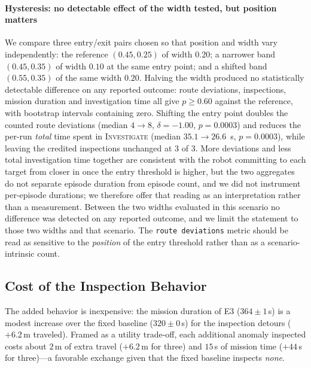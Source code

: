 \paragraph*{Hysteresis: no detectable effect of the width tested, but position
matters}
We compare three entry/exit pairs chosen so that position and width vary
independently: the reference $(0.45,0.25)$ of width $0.20$; a narrower band
$(0.45,0.35)$ of width $0.10$ at the same entry point; and a shifted band
$(0.55,0.35)$ of the same width $0.20$. Halving the width produced no statistically
detectable difference on any reported outcome: route deviations, inspections,
mission duration and investigation time all give $p\ge0.60$ against the reference,
with bootstrap intervals containing zero.
Shifting the entry point doubles
the counted route deviations (median $4\rightarrow8$, $\delta=-1.00$, $p=0.0003$) and
reduces the per-run \emph{total} time spent in \textsc{Investigate} (median
$35.1\rightarrow26.6$~s, $p=0.0003$), while leaving the credited inspections
unchanged at $3$ of $3$. More deviations and less total investigation time together
are consistent with the robot committing to each target from closer in once the entry
threshold is higher, but the two aggregates do not separate episode duration from
episode count, and we did not instrument per-episode durations; we therefore offer
that reading as an interpretation rather than a measurement. Between the two widths evaluated in this scenario no difference was detected on any
reported outcome, and we limit the statement to those two widths and that scenario.
The \texttt{route deviations} metric should be read as sensitive to the \emph{position}
of the entry threshold rather than as a scenario-intrinsic count.

\subsection{Cost of the Inspection Behavior}
The added behavior is inexpensive: the mission duration of E3 ($364\pm1$\,s) is a
modest increase over the fixed baseline ($320\pm0$\,s) for the inspection
detours ($+6.2$\,m traveled). Framed as a utility trade-off, each additional
anomaly inspected costs about $2$\,m of extra travel ($+6.2$\,m for three) and
$15$\,s of mission time ($+44$\,s for three)---a favorable exchange given that
the fixed baseline inspects \emph{none}.

